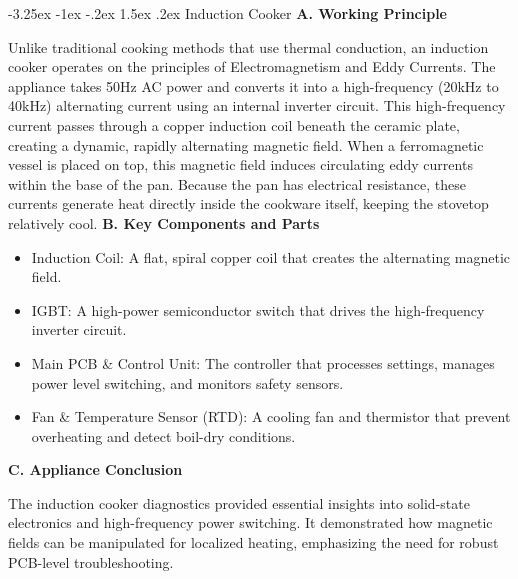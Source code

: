 \documentclass[11pt,a4paper]{report}
\makeatletter
\renewcommand{\section}{\@startsection{section}{1}{\z@}%
  {-3.25ex \@plus -1ex \@minus -.2ex}%
  {1.5ex \@plus.2ex}%
  {\normalfont\Large\bfseries\color{primaryColor}}}
\makeatother
\begin{document}
\section{Induction Cooker}
\noindent\textbf{A. Working Principle}\par\medskip
Unlike traditional cooking methods that use thermal conduction, an induction cooker operates on the principles of Electromagnetism and Eddy Currents. The appliance takes 50Hz AC power and converts it into a high-frequency (20kHz to 40kHz) alternating current using an internal inverter circuit. This high-frequency current passes through a copper induction coil beneath the ceramic plate, creating a dynamic, rapidly alternating magnetic field. When a ferromagnetic vessel is placed on top, this magnetic field induces circulating eddy currents within the base of the pan. Because the pan has electrical resistance, these currents generate heat directly inside the cookware itself, keeping the stovetop relatively cool.
\noindent\textbf{B. Key Components and Parts}\par\medskip
\begin{itemize}
  \item Induction Coil: A flat, spiral copper coil that creates the alternating magnetic field.
  \item IGBT: A high-power semiconductor switch that drives the high-frequency inverter circuit.
  \item Main PCB \& Control Unit: The controller that processes settings, manages power level switching, and monitors safety sensors.
  \item Fan \& Temperature Sensor (RTD): A cooling fan and thermistor that prevent overheating and detect boil-dry conditions.
\end{itemize}
\noindent\textbf{C. Appliance Conclusion}\par\medskip
The induction cooker diagnostics provided essential insights into solid-state electronics and high-frequency power switching. It demonstrated how magnetic fields can be manipulated for localized heating, emphasizing the need for robust PCB-level troubleshooting.
\end{document}
